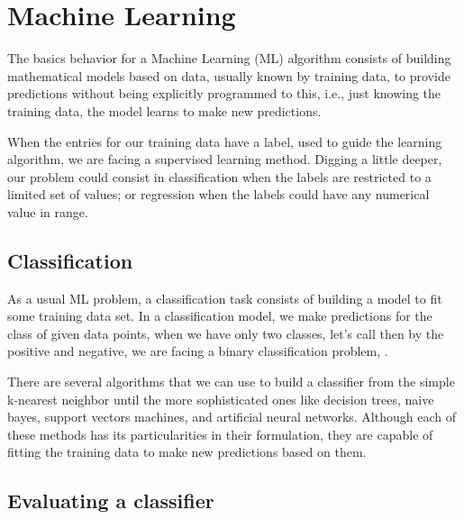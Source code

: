 \section{Machine Learning}
	
	The basics behavior for a Machine Learning (ML) algorithm consists of building mathematical models based on data, usually known by training data, to provide predictions without being explicitly programmed to this, i.e., just knowing the training data, the model learns to make new predictions. 
	
	When the entries for our training data have a label, used to guide the learning algorithm, we are facing a supervised learning method. Digging a little deeper, our problem could consist in classification when the labels are restricted to a limited set of values; or regression when the labels could have any numerical value in range. 
		
	\subsection{Classification}
	
	As a usual ML problem, a classification task consists of building a model to fit some training data set. In a classification model, we make predictions for the class of given data points, when we have only two classes, let's call then by the positive and negative, we are facing a binary classification problem, \cite{pmlr-v81-menon18a}.
	
	There are several algorithms that we can use to build a classifier from the simple k-nearest neighbor until the more sophisticated ones like decision trees, naive bayes, support vectors machines, and artificial neural networks. Although each of these methods has its particularities in their formulation, they are capable of fitting the training data to make new predictions based on them.
	
	
		
	\subsection{Evaluating a classifier}
	
